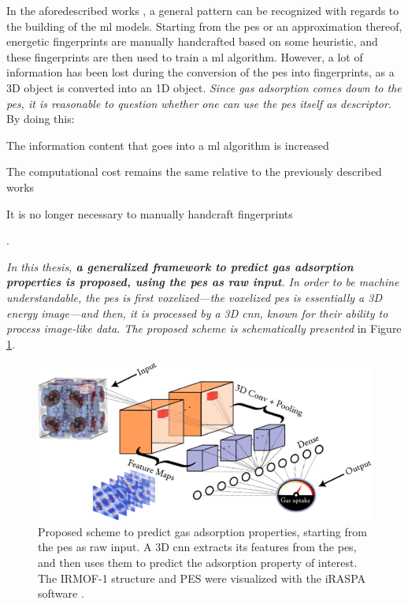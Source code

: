 In the aforedescribed works \parencite{bucior, generic}, a general pattern can
be recognized with regards to the building of the \gls{ml} models. Starting from
the \gls{pes} or an approximation thereof, energetic fingerprints are manually
handcrafted based on some heuristic, and these fingerprints are then used to
train a \gls{ml} algorithm. However, a lot of information has been lost during
the conversion of the \gls{pes} into fingerprints, as a 3D object is converted
into an 1D object. \emph{Since gas adsorption comes down to the \gls{pes}, it is
reasonable to question whether one can use the \gls{pes} itself as descriptor}.
By doing this:
\begin{enumerate*}[label=\roman*).]
	\item The information content that goes into a \gls{ml} algorithm is increased
	\item The computational cost remains the same relative
		to the previously described works
	\item It is no longer necessary to manually handcraft fingerprints
\end{enumerate*}.

\emph{In this thesis, \textbf{a generalized framework to predict gas adsorption
properties is proposed, using the \gls{pes} as raw input}. In order to be
machine understandable, the \gls{pes} is first voxelized---the voxelized
\gls{pes} is essentially a 3D energy image---and then, it is
processed by a 3D \gls{cnn}, known for their ability to process image-like data.
The proposed scheme is schematically presented} in Figure \ref{fig:approach}.

\begin{figure}
	\centering
	\includegraphics[width=\textwidth]{fig/approach.pdf}
	\caption[Generalized framework to predict gas adsorption
	properties.]{Proposed scheme to predict gas adsorption properties, starting
	from the \gls{pes} as raw input. A 3D \gls{cnn} extracts its
	features from the \gls{pes}, and then uses them to predict
	the adsorption property of interest. The IRMOF-1 structure and PES were
	visualized with the iRASPA software \parencite{Dubbeldam2018}.}
	\label{fig:approach}
\end{figure}
